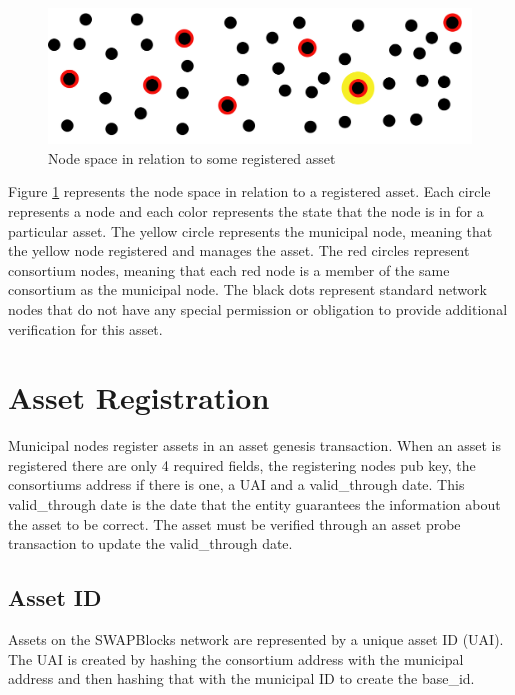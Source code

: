 \documentclass[12pt]{article}
\begin{document}
\begin{figure}[h]
	\centering
	\includegraphics[width=.85\textwidth]{node_space}
	\caption{Node space in relation to some registered asset}
	\label{fig:nodespace1}
\end{figure}


Figure \ref{fig:nodespace1} represents the node space in relation to a registered asset.
Each circle represents a node and each color represents the state that the
node is in for a particular asset.  The yellow circle represents the municipal node, meaning
that the yellow node registered and manages the asset.  The red circles represent consortium 
nodes, meaning that each red node is a member of the same consortium as the municipal node.
The black dots represent standard network nodes that do not have any special permission or
obligation to provide additional verification for this asset.  






\section{Asset Registration}

Municipal nodes register assets in an asset genesis transaction.  When 
an asset is registered there are only 4 required fields, the registering nodes 
pub key, the consortiums address if there is one, a UAI and a valid\_through date.  
This valid\_through date is the date that the entity guarantees the information 
about the asset to be correct.  The asset must be verified through an asset probe 
transaction to update the valid\_through date.

\subsection{Asset ID}

Assets on the SWAPBlocks network are represented by a unique asset ID (UAI).  
The UAI is created by hashing the consortium address with the municipal address 
and then hashing that with the municipal ID to create the base\_id.
\end{document}
